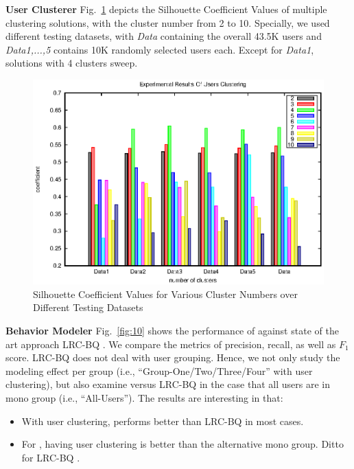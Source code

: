 \textbf{User Clusterer}
%
Fig.\ \ref{fig:uc} depicts the Silhouette Coefficient Values of multiple clustering solutions, with the cluster number from 2 to 10.
Specially, we used different testing datasets, with \textit{Data} containing the overall 43.5K users and \textit{Data1,...,5} contains 10K randomly selected users each.
Except for \textit{Data1}, solutions with 4 clusters sweep.

\begin{figure}[!htb]
\centering
\includegraphics[width=.96\linewidth]{figures/clustering}
\caption{Silhouette Coefficient Values for Various Cluster Numbers over Different Testing Datasets \tbc{}}
\label{fig:uc}
\end{figure}


\textbf{Behavior Modeler}
%
Fig.\ \ref{fig:10} shows the performance of \sys{} against state of the art approach LRC-BQ .
We compare the metrics of precision, recall, as well as $F_1$ score.
LRC-BQ  does not deal with user grouping.
Hence, we not only study the modeling effect per group (i.e., ``Group-One/Two/Three/Four'' with user clustering), but also examine \sys{} versus LRC-BQ  in the case that all users are in mono group (i.e., ``All-Users'').
The results are interesting in that:
\begin{itemize}
	\item With user clustering, \sys{} performs better than LRC-BQ  in most cases.
	\item For \sys{}, having user clustering is better than the alternative mono group. Ditto for LRC-BQ .
\end{itemize}



